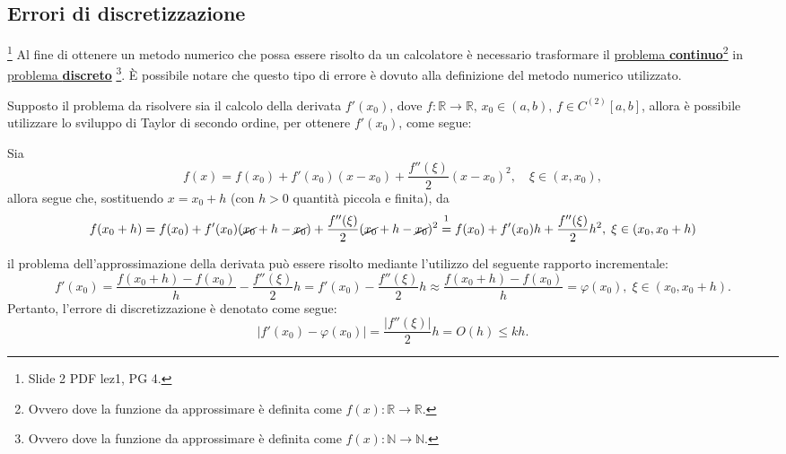 \subsection{Errori di discretizzazione}\label{ssec:errori_discretizzazione}\footnote{Slide 2 PDF lez1, PG 4.}
Al fine di ottenere un metodo numerico che possa essere risolto da un calcolatore è necessario trasformare il \underline{problema \textbf{continuo}}\footnote{Ovvero dove la funzione da approssimare è definita come $f(x):\mathbb R\rightarrow\mathbb R$.} in \underline{problema \textbf{discreto}} \footnote{Ovvero dove la funzione da approssimare è definita come $f(x):\mathbb N\rightarrow\mathbb N$.}. È possibile notare che questo tipo di errore è dovuto alla definizione del metodo numerico utilizzato.

Supposto il problema da risolvere sia il calcolo della derivata $f'(x_0)$, dove $f:\mathbb R\rightarrow\mathbb R,\, x_0\in (a,b),\, f\in C^{(2)}[a,b]$, allora è possibile utilizzare lo sviluppo di Taylor di secondo ordine, per ottenere $f'(x_0)$, come segue:

Sia
\begin{equation*}
	f(x)=f(x_0)+f'(x_0)(x-x_0)+\frac{f''(\xi)}{2}(x-x_0)^2,\quad \xi\in(x,x_0),
\end{equation*}
allora segue che, sostituendo $x=x_0+h$ (con $h>0$ quantità piccola e finita), da
\begin{equation*}
	f(x_0+h)=f(x_0)+f'(x_0)(\cancel{x_0}+h-\cancel{x_0})+\frac{f''(\xi)}{2}(\cancel{x_0}+h-\cancel{x_0})^2\overset{\footnotemark}{=}f(x_0)+f'(x_0)h+\frac{f''(\xi)}{2}h^2,\; \xi\in(x_0,x_0+h)
\end{equation*}


\noindent il problema dell'approssimazione della derivata può essere risolto mediante l'utilizzo del seguente rapporto incrementale:
\begin{equation}\label{eq:approxF'ErrDiscr}
	f'(x_0)=\frac{f(x_0+h)-f(x_0)}{h}-\frac{f''(\xi)}{2}h=f'(x_0)-\frac{f''(\xi)}{2}h\approx\frac{f(x_0+h)-f(x_0)}{h}=\varphi(x_0),\; \xi\in(x_0,x_0+h).
\end{equation}
Pertanto, l'errore di discretizzazione è denotato come segue:
\begin{equation*}
	|f'(x_0)-\varphi(x_0)|=\frac{|f''(\xi)|}{2}h=O(h)\leq kh.
\end{equation*}

